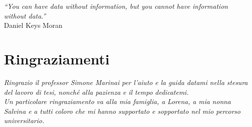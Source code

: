 \thispagestyle{empty}
\begin{flushright}
	\textit{“You can have data without information, but you cannot have information without data.”} \\Daniel Keys Moran
\end{flushright}

\chapter*{Ringraziamenti}
\thispagestyle{empty}
\textit{Ringrazio il professor Simone Marinai per l'aiuto e la guida datami nella stesura del lavoro di tesi, nonché alla pazienza e il tempo dedicatemi. \\Un particolare ringraziamento va alla mia famiglia, a Lorena, a mia nonna Salvina e a tutti coloro che mi hanno supportato e sopportato nel mio percorso universitario.}
